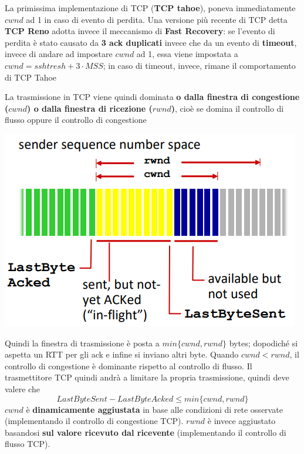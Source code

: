 \documentclass[12pt]{article}
\begin{document}
\begin{enumerate}
\begin{center}
    \end{center}
    La primissima implementazione di TCP (\textbf{TCP tahoe}), poneva immediatamente $cwnd$ ad 1 in caso di evento di perdita.
    Una versione più recente di TCP detta \textbf{TCP Reno} adotta invece il meccanismo di \textbf{Fast Recovery}: se l'evento di perdita è stato causato da \textbf{3 ack duplicati} invece che da un evento di \textbf{timeout},
    invece di andare ad impostare $cwnd$ ad 1, essa viene impostata a $cwnd = sshtresh + 3 \cdot MSS$; in caso di timeout, invece, rimane il comportamento di TCP Tahoe
\end{enumerate}
La trasmissione in TCP viene quindi dominata \textbf{o dalla finestra di congestione ($cwnd$) o dalla finestra di ricezione ($rwnd$)}, cioè se domina il controllo di flusso oppure il controllo di congestione
\begin{center}
    \includegraphics[width = 0.55\linewidth]{Images/72.png}
\end{center}
Quindi la finestra di trasmissione è posta a $min\{cwnd, rwnd\}$ bytes; dopodiché si aspetta un RTT per gli ack e infine si inviano altri byte.
Quando $cwnd < rwnd$, il controllo di congestione è dominante rispetto al controllo di flusso.
Il trasmettitore TCP quindi andrà a limitare la propria trasmissione, quindi deve valere che
$$LastByteSent - LastByteAcked \leq min\{cwnd, rwnd\}$$
$cwnd$ è \textbf{dinamicamente aggiustata} in base alle condizioni di rete osservate (implementando il controllo di congestione TCP).
$rwnd$ è invece aggiustato basandosi \textbf{sul valore ricevuto dal ricevente} (implementando il controllo di flusso TCP).
\end{document}
